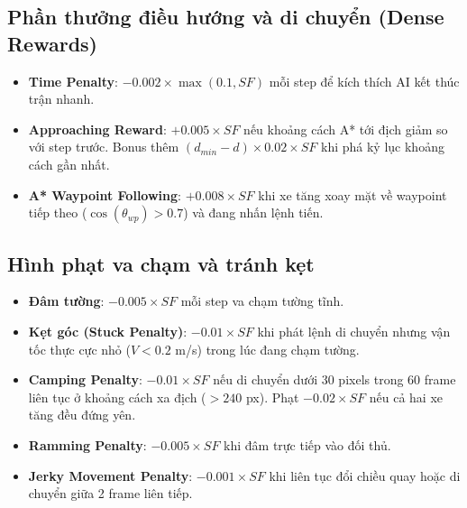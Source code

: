 \documentclass[a4paper, 12pt]{report}
\begin{document}
  \subsection{Phần thưởng điều hướng và di chuyển (Dense Rewards)}
  \begin{itemize}
    \item \textbf{Time Penalty}: $-0.002 \times \max(0.1, SF)$ mỗi step để kích thích AI kết thúc trận nhanh.
    \item \textbf{Approaching Reward}: $+0.005 \times SF$ nếu khoảng cách A* tới địch giảm so với step trước. Bonus thêm $(d_{min} - d) \times 0.02 \times SF$ khi phá kỷ lục khoảng cách gần nhất.
    \item \textbf{A* Waypoint Following}: $+0.008 \times SF$ khi xe tăng xoay mặt về waypoint tiếp theo ($\cos(\theta_{wp}) > 0.7$) và đang nhấn lệnh tiến.
  \end{itemize}

  \subsection{Hình phạt va chạm và tránh kẹt}
  \begin{itemize}
    \item \textbf{Đâm tường}: $-0.005 \times SF$ mỗi step va chạm tường tĩnh.
    \item \textbf{Kẹt góc (Stuck Penalty)}: $-0.01 \times SF$ khi phát lệnh di chuyển nhưng vận tốc thực cực nhỏ ($V < 0.2$ m/s) trong lúc đang chạm tường.
    \item \textbf{Camping Penalty}: $-0.01 \times SF$ nếu di chuyển dưới 30 pixels trong 60 frame liên tục ở khoảng cách xa địch ($>240$ px). Phạt $-0.02 \times SF$ nếu cả hai xe tăng đều đứng yên.
    \item \textbf{Ramming Penalty}: $-0.005 \times SF$ khi đâm trực tiếp vào đối thủ.
    \item \textbf{Jerky Movement Penalty}: $-0.001 \times SF$ khi liên tục đổi chiều quay hoặc di chuyển giữa 2 frame liên tiếp.
  \end{itemize}
\end{document}
